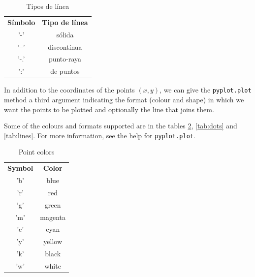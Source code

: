 \begin{paracol}{2}
      \begin{table}
        \centering
        \begin{tabular}{|c|c|} \hline
        \textbf{Símbolo}     &  \textbf{Tipo de línea}\\
             '-'& sólida \\ \hline
             '--'& discontínua\\ \hline
             '-.'& punto-raya \\ \hline
             ':'& de puntos\\ \hline
        \end{tabular}
        \caption{Tipos de línea}
        \label{tab:lineas}
    \end{table}  
    \switchcolumn
    In addition to the coordinates of the points $(x,y)$, we can give the \texttt{pyplot.plot} method a third argument indicating the format (colour and shape) in which we want the points to be plotted and optionally the line that joins them. 

    Some of the colours and formats supported are in the tables \ref{tab:colours}, \ref{tab:dots} and \ref{tab:lines}. For more information, see the help for \texttt{pyplot.plot}.
    
    \begin{table}
        \centering
        \begin{tabular}{|c|c|} \hline
        \textbf{Symbol}     &  \textbf{Color}\\
             'b'& blue \\ \hline
             'r'& red \\ \hline
             'g'& green \\ \hline
             'm'& magenta\\ \hline
             'c'& cyan\\ \hline
             'y'& yellow\\ \hline
             'k'& black\\ \hline
             'w'& white\\ \hline
        \end{tabular}
        \caption{Point colors}
        \label{tab:colours}
    \end{table}


\end{paracol}
